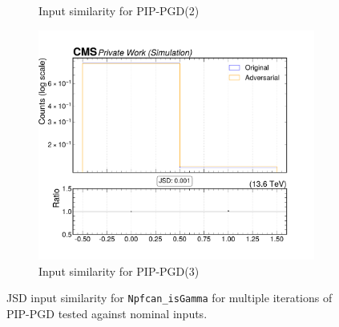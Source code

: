 \begin{figure}[htbp]
\begin{subfigure}[t]{0.32\textwidth}
    \caption*{Input similarity for PIP-PGD(2)}
  \end{subfigure}\hfill
  \begin{subfigure}[t]{0.32\textwidth}
    \includegraphics[width=\linewidth]{media/output/features/compare/combined_it_3/cmp_npf_arr_Npfcan_isGamma.pdf}
    \caption*{Input similarity for PIP-PGD(3)}
  \end{subfigure}

  \caption*{JSD input similarity for \texttt{Npfcan\_isGamma} for multiple iterations of PIP-PGD tested against nominal inputs.}
  \label{fig:combined_input_Npfcan_isGamma}
\end{figure}

